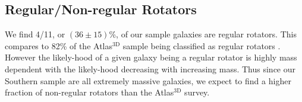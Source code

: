 \documentclass[a4paper,fleqn,usenatbib]{mnras}
\begin{document}
\begin{table}
\begin{tabular}{l c c c c c c c}
		\end{tabular}
	\end{table}

	\subsection{Regular/Non-regular Rotators}
		We find 4/11, or $(36\pm15)$\%, of our sample galaxies are regular rotators. This compares to 82\% of the Atlas$^\text{3D}$ sample being classified as regular rotators \citep{Krajnovic2011}. However the likely-hood of a given galaxy being a regular rotator is highly mass dependent with the likely-hood decreasing with increasing mass. Thus since our Southern sample are all extremely massive galaxies, we expect to find a higher fraction of non-regular rotators than the Atlas$^\text{3D}$ survey.
	
\end{document}
